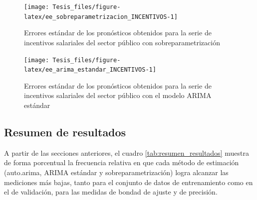 \documentclass[
]{article}
\begin{document}
\begin{figure}[H]
\texttt{[image: Tesis\_files/figure-latex/ee\_sobreparametrizacion\_INCENTIVOS-1]} \caption{Errores estándar de los pronósticos obtenidos para la serie de incentivos salariales del sector público con sobreparametrización}\label{fig:ee_sobreparametrizacion_INCENTIVOS}
\end{figure}

\begin{figure}[H]
\texttt{[image: Tesis\_files/figure-latex/ee\_arima\_estandar\_INCENTIVOS-1]} \caption{Errores estándar de los pronósticos obtenidos para la serie de incentivos salariales del sector público con el modelo ARIMA estándar}\label{fig:ee_arima_estandar_INCENTIVOS}
\end{figure}

\subsection{Resumen de resultados}

A partir de las secciones anteriores, el cuadro
\ref{tab:resumen_resultados} muestra de forma porcentual la frecuencia
relativa en que cada método de estimación (auto.arima, ARIMA estándar y
sobreparametrización) logra alcanzar las mediciones más bajas, tanto
para el conjunto de datos de entrenamiento como en el de validación,
para las medidas de bondad de ajuste y de precisión.

\begin{table}[H]

\caption{\label{tab:unnamed-chunk-38}\label{tab:resumen_resultados}Distribución porcentual de los métodos de estimación que alcanzaron los mejores resultados según conjunto de datos y tipo de medición}
\centering
{}
\end{table}
\end{document}

